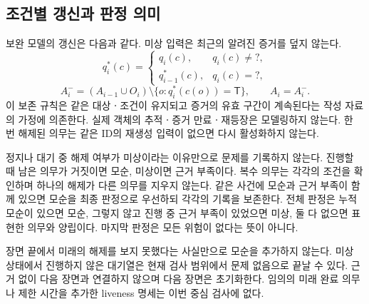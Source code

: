 \begin{revision}
\subsection{조건별 갱신과 판정 의미}
\label{sec:semantics}
보완 모델의 갱신은 다음과 같다. 미상 입력은 최근의 알려진 증거를 덮지 않는다.
\begin{equation}
q_i^*(c)=\begin{cases}q_i(c),&q_i(c)\ne ?,\\q_{i-1}^*(c),&q_i(c)=?,\end{cases}
\end{equation}
\begin{equation}
A_i^-=(A_{i-1}\cup O_i)\setminus\{o:q_i^*(c(o))=\mathsf{T}\},\qquad A_i=A_i^- .
\label{eq:active-update}
\end{equation}
이 보존 규칙은 같은 대상ㆍ조건이 유지되고 증거의 유효 구간이 계속된다는 작성 자료의 가정에 의존한다. 실제 객체의 추적ㆍ증거 만료ㆍ재등장은 모델링하지 않는다. 한 번 해제된 의무는 같은 ID의 재생성 입력이 없으면 다시 활성화하지 않는다.

정지나 대기 중 해제 여부가 미상이라는 이유만으로 문제를 기록하지 않는다. 진행할 때 남은 의무가 거짓이면 모순, 미상이면 근거 부족이다. 복수 의무는 각각의 조건을 확인하며 하나의 해제가 다른 의무를 지우지 않는다. 같은 사건에 모순과 근거 부족이 함께 있으면 모순을 최종 판정으로 우선하되 각각의 기록을 보존한다. 전체 판정은 누적 모순이 있으면 모순, 그렇지 않고 진행 중 근거 부족이 있었으면 미상, 둘 다 없으면 표현한 의무와 양립이다. 마지막 판정은 모든 위험이 없다는 뜻이 아니다.

장면 끝에서 미래의 해제를 보지 못했다는 사실만으로 모순을 추가하지 않는다. 미상 상태에서 진행하지 않은 대기열은 현재 검사 범위에서 문제 없음으로 끝날 수 있다. 근거 없이 다음 장면과 연결하지 않으며 다음 장면은 초기화한다. 임의의 미래 완료 의무나 제한 시간을 추가한 liveness 명세는 이번 중심 검사에 없다.
\end{revision}
